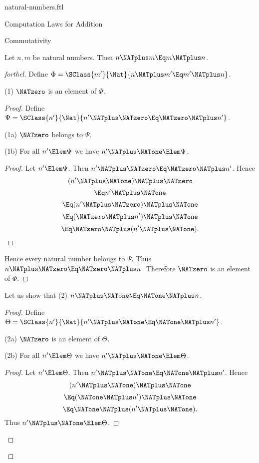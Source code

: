 \documentclass{stex}
\begin{document}
\begin{smodule}{natural-numbers.ftl}
\begin{sfragment}{Computation Laws for Addition}
  \begin{sfragment}{Commutativity}
    \begin{proposition}[forthel,id=ARITHMETIC_03_4029553232052224]
      Let $n, m$ be natural numbers.
      Then $n \NATplus m \Eq m \NATplus n$.
    \end{proposition}
    \begin{proof}[forthel]
      Define $\Phi = \SClass{m'}{\Nat}{n \NATplus m' \Eq m' \NATplus n}$.

      (1) $\NATzero$ is an element of $\Phi$.
      \begin{proof}
        Define $\Psi = \SClass{n'}{\Nat}{n' \NATplus \NATzero \Eq \NATzero \NATplus n'}$.

        (1a) $\NATzero$ belongs to $\Psi$.

        (1b) For all $n' \Elem \Psi$ we have $n' \NATplus \NATone \Elem \Psi$.
        \begin{proof}
          Let $n' \Elem \Psi$.
          Then $n' \NATplus \NATzero \Eq \NATzero \NATplus n'$.
          Hence
          \[  (n' \NATplus \NATone) \NATplus \NATzero        \]
          \[    \Eq n' \NATplus \NATone          \]
          \[    \Eq (n' \NATplus \NATzero) \NATplus \NATone    \]
          \[    \Eq (\NATzero \NATplus n') \NATplus \NATone    \]
          \[    \Eq \NATzero \NATplus (n' \NATplus \NATone).   \]
        \end{proof}

        Hence every natural number belongs to $\Psi$.
        Thus $n \NATplus \NATzero \Eq \NATzero \NATplus n$.
        Therefore $\NATzero$ is an element of $\Phi$.
      \end{proof}

      Let us show that (2) $n \NATplus \NATone \Eq \NATone \NATplus n$.
      \begin{proof}
        Define $\Theta = \SClass{n'}{\Nat}{n' \NATplus \NATone \Eq \NATone \NATplus n'}$.

        (2a) $\NATzero$ is an element of $\Theta$.

        (2b) For all $n' \Elem \Theta$ we have $n' \NATplus \NATone \Elem \Theta$.
        \begin{proof}
          Let $n' \Elem \Theta$.
          Then $n' \NATplus \NATone \Eq \NATone \NATplus n'$.
          Hence
          \[  (n' \NATplus \NATone) \NATplus \NATone        \]
          \[    \Eq (\NATone \NATplus n') \NATplus \NATone    \]
          \[    \Eq \NATone \NATplus (n' \NATplus \NATone).   \]
          Thus $n' \NATplus \NATone \Elem \Theta$.
        \end{proof}


\end{proof}
\end{proof}
\end{sfragment}
\end{sfragment}
\end{smodule}
\end{document}
